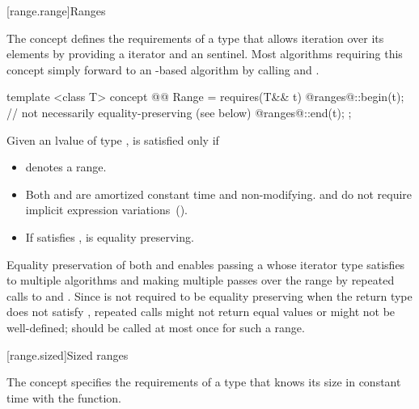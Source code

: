 {[range.range]{Ranges}

\pnum
The  concept defines the requirements of a type that allows
iteration over its elements by providing a  iterator and an
 sentinel.
\enternote Most algorithms requiring this concept simply forward to an
-based algorithm by calling  and . \exitnote

\begin{itemdecl}
template <class T>
concept @@ Range =
  requires(T&& t) {
    @ranges@::begin(t); // not necessarily equality-preserving (see below)
    @ranges@::end(t);
  };
\end{itemdecl}

\begin{itemdescr}

\pnum
Given an lvalue  of type ,  is satisfied
only if

\begin{itemize}
\item {} denotes a range.

\item Both  and  are amortized constant time
and non-modifying. \enternote {} and  do not require
implicit expression variations~(). \exitnote

\item If  satisfies ,
 is equality preserving.
\end{itemize}
\end{itemdescr}

\pnum \enternote
Equality preservation of both  and  enables passing a 
whose iterator type satisfies 
to multiple algorithms and
making multiple passes over the range by repeated calls to  and .
Since  is not required to be equality preserving when the return type does
not satisfy , repeated calls might not return equal values or
might not be well-defined;  should be called at most once for such a range.
\exitnote

[range.sized]{Sized ranges}

\pnum
The  concept specifies the requirements
of a  type that knows its size in constant time with the
 function.

}

